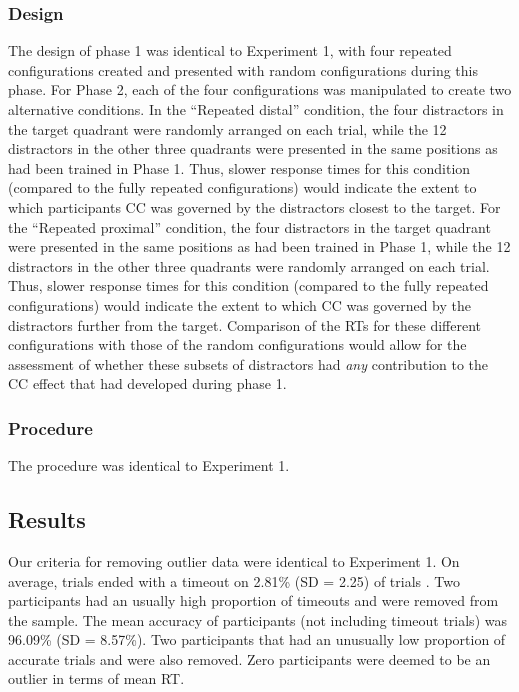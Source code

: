 \documentclass[
  man,floatsintext]{apa7}
\begin{document}
\hypertarget{design-2}{%
\subsubsection{Design}\label{design-2}}

The design of phase 1 was identical to Experiment 1, with four repeated configurations created and presented with random configurations during this phase. For Phase 2, each of the four configurations was manipulated to create two alternative conditions. In the ``Repeated distal'' condition, the four distractors in the target quadrant were randomly arranged on each trial, while the 12 distractors in the other three quadrants were presented in the same positions as had been trained in Phase 1. Thus, slower response times for this condition (compared to the fully repeated configurations) would indicate the extent to which participants CC was governed by the distractors closest to the target. For the ``Repeated proximal'' condition, the four distractors in the target quadrant were presented in the same positions as had been trained in Phase 1, while the 12 distractors in the other three quadrants were randomly arranged on each trial. Thus, slower response times for this condition (compared to the fully repeated configurations) would indicate the extent to which CC was governed by the distractors further from the target. Comparison of the RTs for these different configurations with those of the random configurations would allow for the assessment of whether these subsets of distractors had \emph{any} contribution to the CC effect that had developed during phase 1.

\hypertarget{procedure-2}{%
\subsubsection{Procedure}\label{procedure-2}}

The procedure was identical to Experiment 1.

\hypertarget{results-2}{%
\subsection{Results}\label{results-2}}

Our criteria for removing outlier data were identical to Experiment 1. On average, trials ended with a timeout on 2.81\% (SD = 2.25) of trials . Two participants had an usually high proportion of timeouts and were removed from the sample. The mean accuracy of participants (not including timeout trials) was 96.09\% (SD = 8.57\%). Two participants that had an unusually low proportion of accurate trials and were also removed. Zero participants were deemed to be an outlier in terms of mean RT.
\end{document}
